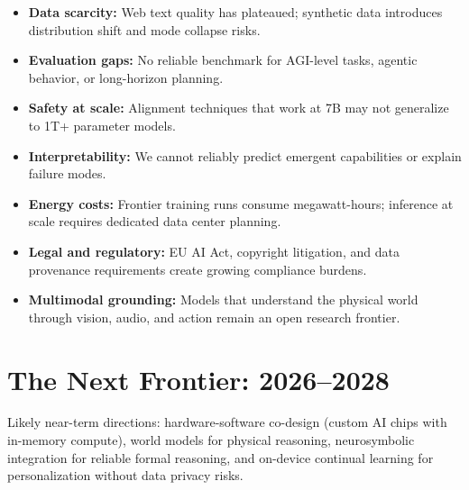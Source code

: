 \begin{itemize}
  \item \textbf{Data scarcity:} Web text quality has plateaued; synthetic data introduces distribution shift and mode collapse risks.
  \item \textbf{Evaluation gaps:} No reliable benchmark for AGI-level tasks, agentic behavior, or long-horizon planning.
  \item \textbf{Safety at scale:} Alignment techniques that work at 7B may not generalize to 1T+ parameter models.
  \item \textbf{Interpretability:} We cannot reliably predict emergent capabilities or explain failure modes.
  \item \textbf{Energy costs:} Frontier training runs consume megawatt-hours; inference at scale requires dedicated data center planning.
  \item \textbf{Legal and regulatory:} EU AI Act, copyright litigation, and data provenance requirements create growing compliance burdens.
  \item \textbf{Multimodal grounding:} Models that understand the physical world through vision, audio, and action remain an open research frontier.
\end{itemize}

\section{The Next Frontier: 2026--2028}

Likely near-term directions: hardware-software co-design (custom AI chips with in-memory compute), world models for physical reasoning, neurosymbolic integration for reliable formal reasoning, and on-device continual learning for personalization without data privacy risks.


